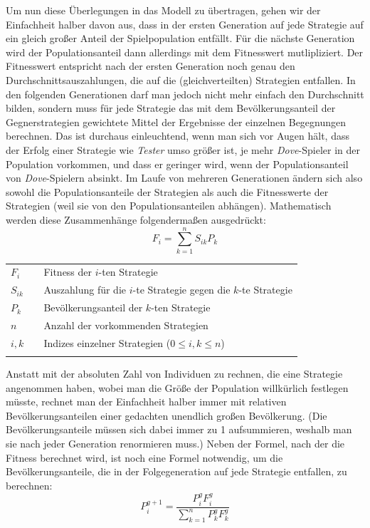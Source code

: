 Um nun diese Überlegungen in das Modell zu übertragen, gehen wir der Einfachheit
halber davon aus, dass in der ersten Generation auf jede Strategie auf ein gleich
großer Anteil der Spielpopulation entfällt. Für die nächste Generation wird der
Populationsanteil dann allerdings mit dem Fitnesswert mutlipliziert. Der
Fitnesswert entspricht nach der ersten Generation noch genau den
Durchschnittsauszahlungen, die auf die (gleichverteilten) Strategien entfallen.
In den folgenden Generationen darf man jedoch nicht mehr einfach den Durchschnitt
bilden, sondern muss für jede Strategie das mit dem Bevölkerungsanteil der
Gegnerstrategien gewichtete Mittel der Ergebnisse der einzelnen Begegnungen
berechnen. Das ist durchaus einleuchtend, wenn man sich vor Augen hält, dass der
Erfolg einer Strategie wie {\em Tester} umso größer ist, je mehr {\em
Dove}-Spieler in der Population vorkommen, und dass er geringer wird, wenn der
Populationsanteil von {\em Dove}-Spielern absinkt. Im Laufe von mehreren
Generationen ändern sich also sowohl die Populationsanteile der Strategien als
auch die Fitnesswerte der Strategien (weil sie von den Populationsanteilen
abhängen). Mathematisch werden diese Zusammenhänge folgendermaßen ausgedrückt:
\begin{equation}
\label{fitnessEquation}
F_i = \sum_{k=1}^n S_{ik}P_k
\end{equation}

\begin{tabular}{lll}
  $F_i$    & &  Fitness der $i$-ten Strategie \\
  $S_{ik}$  & & Auszahlung für die $i$-te Strategie gegen die
  $k$-te Strategie \\ 
  $P_k$  & & Bevölkerungsanteil der $k$-ten Strategie \\
  $n$ & & Anzahl der vorkommenden Strategien \\
  $i,k$ & & Indizes einzelner Strategien ($0 \leq i,k \leq n$) \\
& & \\
\end{tabular}

Anstatt mit der absoluten Zahl von Individuen zu rechnen, die eine Strategie
angenommen haben, wobei man die Größe der Population willkürlich festlegen
müsste, rechnet man der Einfachheit halber immer mit relativen
Bevölkerungsanteilen einer gedachten unendlich großen Bevölkerung. (Die
Bevölkerungsanteile müssen sich dabei immer zu 1 aufsummieren, weshalb man sie
nach jeder Generation renormieren muss.)
Neben der Formel, nach der die Fitness berechnet wird, ist noch eine Formel
notwendig, um die Bevölkerungsanteile, die in der Folgegeneration auf jede
Strategie entfallen, zu berechnen:
\begin{equation}
\label{populationEquation}
P_i^{g+1} = \frac{P_i^gF_i^g}{\sum_{k=1}^n P_k^gF_k^g}
\end{equation}

